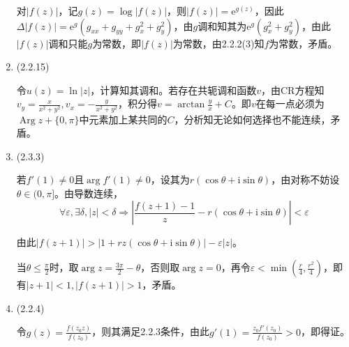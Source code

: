 \documentclass[a4paper,UTF8,fontset=windows]{ctexart}
\DeclareMathOperator{\Arg}{Arg}
\begin{document}
\begin{enumerate}
    对$|f(z)|$，记$g(z)=\log|f(z)|$，则$|f(z)|=\mathrm{e}^{g(z)}$，因此$\Delta|f(z)|=\mathrm{e}^g(g_{xx}+g_{yy}+g_x^2+g_y^2)$，由$g$调和知其为$\mathrm{e}^g(g_x^2+g_y^2)$，由此$|f(z)|$调和只能$g$为常数，即$|f(z)|$为常数，由2.2.2(3)知$f$为常数，矛盾。

    \item (2.2.15)

    令$u(z)=\ln|z|$，计算知其调和。若存在共轭调和函数$v$，由CR方程知$v_y=\frac{x}{x^2+y^2},v_x=-\frac{y}{x^2+y^2}$，积分得$v=\arctan\frac{y}{x}+C$。即$v$在每一点必须为$\Arg z+\{0,\pi\}$中元素加上某共同的$C$，分析知无论如何选择也不能连续，矛盾。

    \item (2.3.3)

    若$f'(1)\ne0$且$\arg f'(1)\ne0$，设其为$r(\cos\theta+\mathrm{i}\sin\theta)$，由对称不妨设$\theta\in(0,\pi]$。由导数连续，
    \[\forall\varepsilon,\exists\delta,|z|<\delta\Rightarrow\left|\frac{f(z+1)-1}{z}-r(\cos\theta+\mathrm{i}\sin\theta)\right|<\varepsilon\]

    由此$|f(z+1)|>|1+rz(\cos\theta+\mathrm{i}\sin\theta)|-\varepsilon|z|$。

    当$\theta\le\frac{\pi}{2}$时，取$\arg z=\frac{3\pi}{2}-\theta$，否则取$\arg z=0$，再令$\varepsilon<\min(\frac{r}{4},\frac{r^2}{4})$，即有$|z+1|<1,|f(z+1)|>1$，矛盾。

    \item (2.2.4)

    令$g(z)=\frac{f(z_0z)}{f(z_0)}$，则其满足2.2.3条件，由此$g'(1)=\frac{z_0f'(z_0)}{f(z_0)}>0$，即得证。
\end{enumerate}
\end{document}
